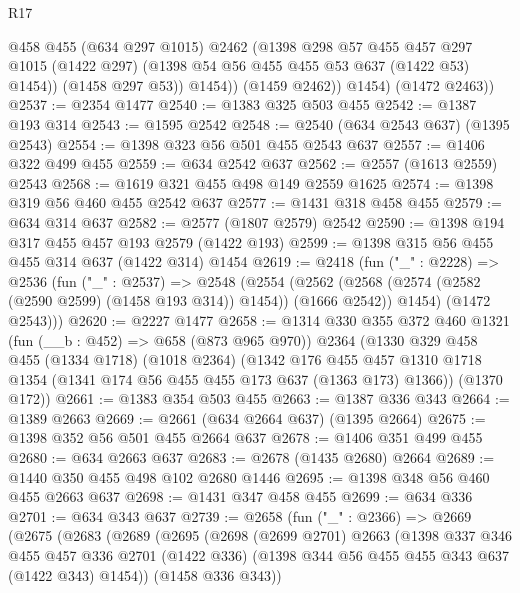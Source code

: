 \begin{lexlean}{R17}
\begin{coremodule}
                @458
                @455
                (@634 @297 @1015)
                @2462
                (@1398
                  @298
                  @57
                  @455
                  @457
                  @297
                  @1015
                  (@1422 @297)
                  (@1398 @54 @56 @455 @455 @53 @637 (@1422 @53) @1454))
                (@1458 @297 @53))
              @1454))
          (@1459 @2462))
        @1454)
      (@1472 @2463))
@2537 := @2354 @1477
@2540 := @1383 @325 @503 @455
@2542 := @1387 @193 @314
@2543 := @1595 @2542
@2548 := @2540 (@634 @2543 @637) (@1395 @2543)
@2554 := @1398 @323 @56 @501 @455 @2543 @637
@2557 := @1406 @322 @499 @455
@2559 := @634 @2542 @637
@2562 := @2557 (@1613 @2559) @2543
@2568 := @1619 @321 @455 @498 @149 @2559 @1625
@2574 := @1398 @319 @56 @460 @455 @2542 @637
@2577 := @1431 @318 @458 @455
@2579 := @634 @314 @637
@2582 := @2577 (@1807 @2579) @2542
@2590 := @1398 @194 @317 @455 @457 @193 @2579 (@1422 @193)
@2599 := @1398 @315 @56 @455 @455 @314 @637 (@1422 @314) @1454
@2619 := @2418
    (fun ("_" : @2228) =>
    @2536
      (fun ("_" : @2537) =>
      @2548
        (@2554
          (@2562 (@2568 (@2574 (@2582 (@2590 @2599) (@1458 @193 @314)) @1454)) (@1666 @2542))
          @1454)
        (@1472 @2543)))
@2620 := @2227 @1477
@2658 := @1314
    @330
    @355
    @372
    @460
    @1321
    (fun (__b : @452) => @658 (@873 @965 @970))
    @2364
    (@1330
      @329
      @458
      @455
      (@1334 @1718)
      (@1018 @2364)
      (@1342
        @176
        @455
        @457
        @1310
        @1718
        @1354
        (@1341 @174 @56 @455 @455 @173 @637 (@1363 @173) @1366))
      (@1370 @172))
@2661 := @1383 @354 @503 @455
@2663 := @1387 @336 @343
@2664 := @1389 @2663
@2669 := @2661 (@634 @2664 @637) (@1395 @2664)
@2675 := @1398 @352 @56 @501 @455 @2664 @637
@2678 := @1406 @351 @499 @455
@2680 := @634 @2663 @637
@2683 := @2678 (@1435 @2680) @2664
@2689 := @1440 @350 @455 @498 @102 @2680 @1446
@2695 := @1398 @348 @56 @460 @455 @2663 @637
@2698 := @1431 @347 @458 @455
@2699 := @634 @336
@2701 := @634 @343 @637
@2739 := @2658
    (fun ("_" : @2366) =>
    @2669
      (@2675
        (@2683
          (@2689
            (@2695
              (@2698
                (@2699 @2701)
                @2663
                (@1398
                  @337
                  @346
                  @455
                  @457
                  @336
                  @2701
                  (@1422 @336)
                  (@1398 @344 @56 @455 @455 @343 @637 (@1422 @343) @1454))
                (@1458 @336 @343))

\end{coremodule}
\end{lexlean}
